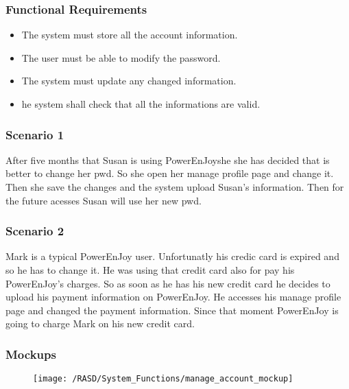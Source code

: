 \subsubsection{Functional Requirements}
\begin{itemize}
  \item The system must store all the account information.
  \item The user must be able to modify the password.
  \item The system must update any changed information.
  \item he system shall check that all the informations are valid.
\end{itemize}

\subsubsection{Scenario 1}
After five months that Susan is using PowerEnJoyshe she has decided that is better to change her \gls{pwd}. So she open her manage profile page and change it. Then she save the changes and the system upload Susan's information. Then for the future acesses Susan will use her new \gls{pwd}.

\subsubsection{Scenario 2}
Mark is a typical PowerEnJoy user. Unfortunatly his credic card is expired and so he has to change it. He was using that credit card also for pay his PowerEnJoy's charges. So as soon as he has his new credit card he decides to upload his payment information on PowerEnJoy. He accesses his manage profile page and changed the payment information. Since that moment PowerEnJoy is going to charge Mark on his new credit card.



\subsubsection{Mockups}
\begin{figure}[!ht]
  \centering
  \vspace{0.2cm}
  \texttt{[image: /RASD/System\_Functions/manage\_account\_mockup]}\\
  \vspace{0.4cm}
  \label{fig:manage_account_mockup} 
\end{figure}


